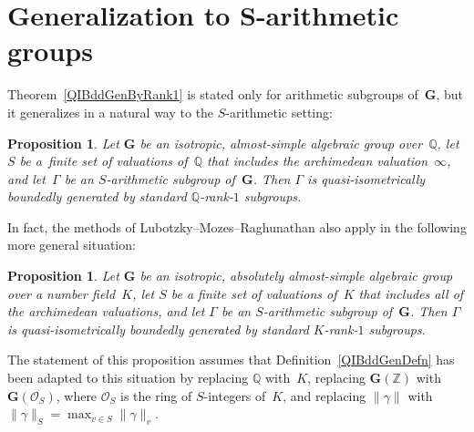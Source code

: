 \documentclass[pdftex]{sigma}
\newcommand{\QQ}{\mathbb{Q}}
\newcommand{\ZZ}{\mathbb{Z}}
\newcommand{\Ga}{\mathbf{G}}
\newcommand{\ints}{\mathcal{O}}
\numberwithin{equation}{section}
\newtheorem{prop}[thm]{Proposition}
\theoremstyle{definition}
\begin{document}
\section[Generalization to $S$-arithmetic groups]{Generalization to $\boldsymbol{S}$-arithmetic groups}\label{SarithSect}

Theorem~\ref{QIBddGenByRank1} is stated only for arithmetic subgroups of~$\Ga$, but it generalizes in a natural way to the $S$-arithmetic setting:

\begin{prop}Let $\Ga$ be an isotropic, almost-simple algebraic group over~$\QQ$, let~$S$ be a~finite set of valuations of~$\QQ$ that includes the archimedean valuation~$\infty$, and let~$\Gamma$ be an $S$-arithmetic subgroup of~$\Ga$. Then $\Gamma$ is quasi-isometrically boundedly generated by standard $\QQ$-rank-$1$ subgroups.
\end{prop}

In fact, the methods of Lubotzky--Mozes--Raghunathan \cite{MR1828742} also apply in the following more general situation:

\begin{prop} \label{GeneralSArith}Let $\Ga$ be an isotropic, absolutely almost-simple algebraic group over a number field~$K$, let $S$ be a finite set of valuations of~$K$ that includes all of the archimedean valuations, and let $\Gamma$ be an $S$-arithmetic subgroup of~$\Ga$. Then $\Gamma$ is quasi-isometrically boundedly generated by standard $K$-rank-$1$ subgroups.
\end{prop}

The statement of this proposition assumes that Definition~\ref{QIBddGenDefn} has been adapted to this situation by replacing $\QQ$ with~$K$, replacing $\Ga(\ZZ)$ with $\Ga(\ints_S)$, where $\ints_S$ is the ring of $S$-integers of~$K$, and replacing $\|\gamma\|$ with
	$\|\gamma\|_S = \max_{v \in S} \| \gamma \|_v$.
\end{document}

